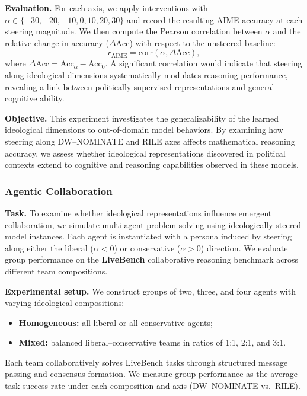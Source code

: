 \documentclass[11pt]{article}
\begin{document}
\textbf{Evaluation.} For each axis, we apply interventions with $\alpha \in \{-30, -20, -10, 0, 10, 20, 30\}$ and record the resulting AIME accuracy at each steering magnitude. We then compute the Pearson correlation between $\alpha$ and the relative change in accuracy ($\Delta \text{Acc}$) with respect to the unsteered baseline:
\begin{equation*}
    r_{\text{AIME}} = \mathrm{corr}\!\left(\alpha, \Delta \text{Acc}\right),
\end{equation*}
where $\Delta \text{Acc} = \text{Acc}_{\alpha} - \text{Acc}_{0}$. A significant correlation would indicate that steering along ideological dimensions systematically modulates reasoning performance, revealing a link between politically supervised representations and general cognitive ability.

\textbf{Objective.} This experiment investigates the generalizability of the learned ideological dimensions to out-of-domain model behaviors. By examining how steering along DW--NOMINATE and RILE axes affects mathematical reasoning accuracy, we assess whether ideological representations discovered in political contexts extend to cognitive and reasoning capabilities observed in these models.

\subsubsection{Agentic Collaboration}

\textbf{Task.} To examine whether ideological representations influence emergent collaboration, we simulate multi-agent problem-solving using ideologically steered model instances. Each agent is instantiated with a persona induced by steering along either the liberal ($\alpha < 0$) or conservative ($\alpha > 0$) direction. We evaluate group performance on the \textbf{LiveBench} collaborative reasoning benchmark across different team compositions.

\textbf{Experimental setup.} We construct groups of two, three, and four agents with varying ideological compositions:
\begin{itemize}
    \item \textbf{Homogeneous:} all-liberal or all-conservative agents;
    \item \textbf{Mixed:} balanced liberal–conservative teams in ratios of 1:1, 2:1, and 3:1.
\end{itemize}
Each team collaboratively solves LiveBench tasks through structured message passing and consensus formation. We measure group performance as the average task success rate under each composition and axis (DW--NOMINATE vs.\ RILE).
\end{document}
